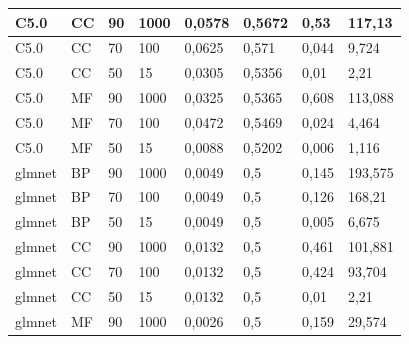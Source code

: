 \documentclass[12pt]{report}
\begin{document}
\begin{appendices}
\begin{longtable}[h]{|l|l|l|l|l|l|l|l|}
C5.0               & CC            & 90                & 1000               & 0,0578         & 0,5672         & 0,53                     & 117,13               \\ \hline
C5.0               & CC            & 70                & 100                & 0,0625         & 0,571          & 0,044                    & 9,724                \\ \hline
C5.0               & CC            & 50                & 15                 & 0,0305         & 0,5356         & 0,01                     & 2,21                 \\ \hline
C5.0               & MF            & 90                & 1000               & 0,0325         & 0,5365         & 0,608                    & 113,088              \\ \hline
C5.0               & MF            & 70                & 100                & 0,0472         & 0,5469         & 0,024                    & 4,464                \\ \hline
C5.0               & MF            & 50                & 15                 & 0,0088         & 0,5202         & 0,006                    & 1,116                \\ \hline
glmnet             & BP            & 90                & 1000               & 0,0049         & 0,5            & 0,145                    & 193,575              \\ \hline
glmnet             & BP            & 70                & 100                & 0,0049         & 0,5            & 0,126                    & 168,21               \\ \hline
glmnet             & BP            & 50                & 15                 & 0,0049         & 0,5            & 0,005                    & 6,675                \\ \hline
glmnet             & CC            & 90                & 1000               & 0,0132         & 0,5            & 0,461                    & 101,881              \\ \hline
glmnet             & CC            & 70                & 100                & 0,0132         & 0,5            & 0,424                    & 93,704               \\ \hline
glmnet             & CC            & 50                & 15                 & 0,0132         & 0,5            & 0,01                     & 2,21                 \\ \hline
glmnet             & MF            & 90                & 1000               & 0,0026         & 0,5            & 0,159                    & 29,574               \\ \hline

\end{longtable}
\end{appendices}
\end{document}
